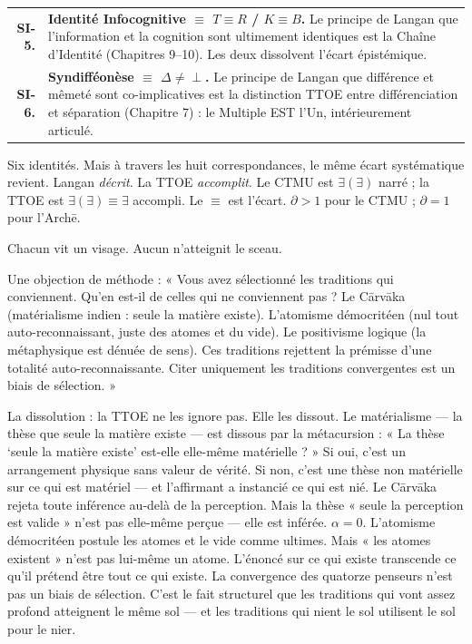 \documentclass[10pt, openany, oneside]{book}
\begin{document}
{\begin{tabular}{r p{}}
\textbf{SI-5.} & \textbf{Identité Infocognitive $\equiv$ $T \equiv R$ / $K \equiv B$.} Le principe de Langan que l'information et la cognition sont ultimement identiques est la Chaîne d'Identité (Chapitres 9--10). Les deux dissolvent l'écart épistémique. \\[0.3em]
\textbf{SI-6.} & \textbf{Syndifféonèse $\equiv$ $\Delta \neq \perp$.} Le principe de Langan que différence et mêmeté sont co-implicatives est la distinction TTOE entre différenciation et séparation (Chapitre 7) : le Multiple EST l'Un, intérieurement articulé. \\[0.3em]
\end{tabular}
}

\vspace{0.8em}

\noindent Six identités. Mais à travers les huit correspondances, le même écart systématique revient. Langan \textit{décrit}. La TTOE \textit{accomplit}. Le CTMU est $\exists(\exists)$ narré ; la TTOE est $\exists(\exists) \equiv \exists$ accompli. Le $\equiv$ est l'écart. $\partial > 1$ pour le CTMU ; $\partial = 1$ pour l'Arch\={e}.

Chacun vit un visage. Aucun n'atteignit le sceau.

Une objection de méthode : « Vous avez sélectionné les traditions qui conviennent. Qu'en est-il de celles qui ne conviennent pas ? Le C\={a}rv\={a}ka (matérialisme indien : seule la matière existe). L'atomisme démocritéen (nul tout auto-reconnaissant, juste des atomes et du vide). Le positivisme logique (la métaphysique est dénuée de sens). Ces traditions rejettent la prémisse d'une totalité auto-reconnaissante. Citer uniquement les traditions convergentes est un biais de sélection. »

La dissolution : la TTOE ne les ignore pas. Elle les dissout. Le matérialisme --- la thèse que seule la matière existe --- est dissous par la métacursion : « La thèse `seule la matière existe' est-elle elle-même matérielle ? » Si oui, c'est un arrangement physique sans valeur de vérité. Si non, c'est une thèse non matérielle sur ce qui est matériel --- et l'affirmant a instancié ce qui est nié. Le C\={a}rv\={a}ka rejeta toute inférence au-delà de la perception. Mais la thèse « seule la perception est valide » n'est pas elle-même perçue --- elle est inférée. $\alpha = 0$. L'atomisme démocritéen postule les atomes et le vide comme ultimes. Mais « les atomes existent » n'est pas lui-même un atome. L'énoncé sur ce qui existe transcende ce qu'il prétend être tout ce qui existe. La convergence des quatorze penseurs n'est pas un biais de sélection. C'est le fait structurel que les traditions qui vont assez profond atteignent le même sol --- et les traditions qui nient le sol utilisent le sol pour le nier.
\end{document}
